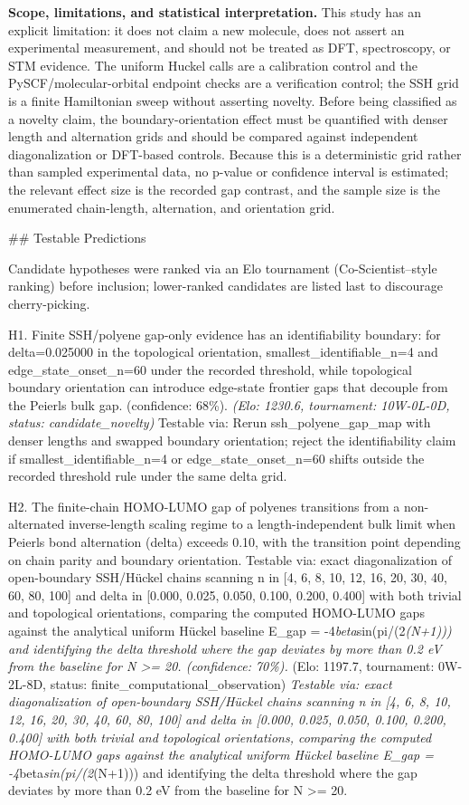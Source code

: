 \documentclass[11pt,a4paper]{article}
\begin{document}
\textbf{Scope, limitations, and statistical interpretation.} This study has an explicit limitation: it does not claim a new molecule, does not assert an experimental measurement, and should not be treated as DFT, spectroscopy, or STM evidence. The uniform Huckel calls are a calibration control and the PySCF/molecular-orbital endpoint checks are a verification control; the SSH grid is a finite Hamiltonian sweep without asserting novelty. Before being classified as a novelty claim, the boundary-orientation effect must be quantified with denser length and alternation grids and should be compared against independent diagonalization or DFT-based controls. Because this is a deterministic grid rather than sampled experimental data, no p-value or confidence interval is estimated; the relevant effect size is the recorded gap contrast, and the sample size is the enumerated chain-length, alternation, and orientation grid.

\#\# Testable Predictions

Candidate hypotheses were ranked via an Elo tournament (Co-Scientist–style ranking) before inclusion; lower-ranked candidates are listed last to discourage cherry-picking.

H1. Finite SSH/polyene gap-only evidence has an identifiability boundary: for delta=0.025000 in the topological orientation, smallest\_identifiable\_n=4 and edge\_state\_onset\_n=60 under the recorded threshold, while topological boundary orientation can introduce edge-state frontier gaps that decouple from the Peierls bulk gap. (confidence: 68\%). \textit{(Elo: 1230.6, tournament: 10W-0L-0D, status: candidate\_novelty)} Testable via: Rerun ssh\_polyene\_gap\_map with denser lengths and swapped boundary orientation; reject the identifiability claim if smallest\_identifiable\_n=4 or edge\_state\_onset\_n=60 shifts outside the recorded threshold rule under the same delta grid.

H2. The finite-chain HOMO-LUMO gap of polyenes transitions from a non-alternated inverse-length scaling regime to a length-independent bulk limit when Peierls bond alternation (delta) exceeds 0.10, with the transition point depending on chain parity and boundary orientation. Testable via: exact diagonalization of open-boundary SSH/Hückel chains scanning n in [4, 6, 8, 10, 12, 16, 20, 30, 40, 60, 80, 100] and delta in [0.000, 0.025, 0.050, 0.100, 0.200, 0.400] with both trivial and topological orientations, comparing the computed HOMO-LUMO gaps against the analytical uniform Hückel baseline E\_gap = -4\textit{beta}sin(pi/(2\textit{(N+1))) and identifying the delta threshold where the gap deviates by more than 0.2 eV from the baseline for N >= 20. (confidence: 70\%). }(Elo: 1197.7, tournament: 0W-2L-8D, status: finite\_computational\_observation)\textit{ Testable via: exact diagonalization of open-boundary SSH/Hückel chains scanning n in [4, 6, 8, 10, 12, 16, 20, 30, 40, 60, 80, 100] and delta in [0.000, 0.025, 0.050, 0.100, 0.200, 0.400] with both trivial and topological orientations, comparing the computed HOMO-LUMO gaps against the analytical uniform Hückel baseline E\_gap = -4}beta\textit{sin(pi/(2}(N+1))) and identifying the delta threshold where the gap deviates by more than 0.2 eV from the baseline for N >= 20.
\end{document}
